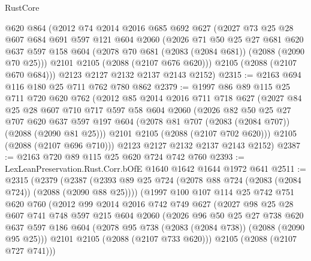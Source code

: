\begin{lexlean}{RustCore}
\begin{coremodule}
    @620
    @864
    (@2012
      @74
      @2014
      @2016
      @685
      @692
      @627
      (@2027
        @73
        @25
        @28
        @607
        @684
        @691
        @597
        @121
        @604
        @2060
        (@2026
          @71
          @50
          @25
          @27
          @681
          @620
          @637
          @597
          @158
          @604
          (@2078 @70 @681 (@2083 (@2084 @681)) (@2088 (@2090 @70 @25)))
          @2101
          @2105
          (@2088 (@2107 @676 @620)))
        @2105
        (@2088 (@2107 @670 @684)))
      @2123
      @2127
      @2132
      @2137
      @2143
      @2152)
@2315 := @2163 @694 @116 @180 @25 @711 @762 @780 @862
@2379 := @1997
    @86
    @89
    @115
    @25
    @711
    @720
    @620
    @762
    (@2012
      @85
      @2014
      @2016
      @711
      @718
      @627
      (@2027
        @84
        @25
        @28
        @607
        @710
        @717
        @597
        @58
        @604
        @2060
        (@2026
          @82
          @50
          @25
          @27
          @707
          @620
          @637
          @597
          @197
          @604
          (@2078 @81 @707 (@2083 (@2084 @707)) (@2088 (@2090 @81 @25)))
          @2101
          @2105
          (@2088 (@2107 @702 @620)))
        @2105
        (@2088 (@2107 @696 @710)))
      @2123
      @2127
      @2132
      @2137
      @2143
      @2152)
@2387 := @2163 @720 @89 @115 @25 @620 @724 @742 @760
@2393 := LexLeanPreservation.Rust.Corr.bOfE @1640 @1642 @1644 @1972 @641
@2511 := @2315
    (@2379
      (@2387
        (@2393 @89 @25 @724 (@2078 @88 @724 (@2083 (@2084 @724)) (@2088 (@2090 @88 @25))))
        (@1997
          @100
          @107
          @114
          @25
          @742
          @751
          @620
          @760
          (@2012
            @99
            @2014
            @2016
            @742
            @749
            @627
            (@2027
              @98
              @25
              @28
              @607
              @741
              @748
              @597
              @215
              @604
              @2060
              (@2026
                @96
                @50
                @25
                @27
                @738
                @620
                @637
                @597
                @186
                @604
                (@2078 @95 @738 (@2083 (@2084 @738)) (@2088 (@2090 @95 @25)))
                @2101
                @2105
                (@2088 (@2107 @733 @620)))
              @2105
              (@2088 (@2107 @727 @741)))

\end{coremodule}
\end{lexlean}
